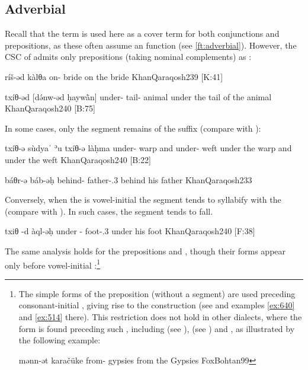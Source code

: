 \subsection{Adverbial \prims}

Recall that the term  is used here as a cover term for both conjunctions and prepositions, as these often assume an  function (see \vref{ft:adverbial}). However, the CSC of \Qar admits only prepositions (taking nominal complements) as \prims: 


{ríš-əd kàlθa}
{on-\cst{} bride}
{on the bride}
{KhanQaraqosh}{239 {[K:41]}}

{txíθ-əd [də́nw-əd ḥaywā̀n]}
{under-\cst{} tail-\cst{} animal}
{under the tail of the animal}
{KhanQaraqosh}{240 {[B:75]}}

In some cases, only the  segment remains of the \cst* suffix (compare with ):

{txíθ-ə sùdyaˈ ʾu\cb{} txíθ-ə làḥma}
	{under-\cst{} warp and\cb{} under-\cst{} weft}
{under the warp and under the weft}
{KhanQaraqosh}{240 {[B:22]}}

{báθr-ə báb-əḥ}
{behind-\cst{} father-\poss.3\masc}
{behind his father}
{KhanQaraqosh}{233}

Conversely, when the \secn is vowel-initial the  segment tends to syllabify with the \secn (compare with ). In such cases, the  segment tends to fall.

{txiθ -d\cb{} àql-əḥ}
{under -\cst\cb{} foot-\poss.3\masc}
{under his foot}
{KhanQaraqosh}{240 {[F:38]}}

\newpage 
The same analysis holds for the prepositions  and , though their \cst* forms appear only before vowel-initial \secns:\footnote{The simple forms of the preposition (without a  segment) are used preceding consonant-initial \secns, giving rise to the  construction (see  and examples \ref{ex:640} and \ref{ex:514} there). This restriction does not hold in other dialects, where the \cst* form  is found preceding such \secns, including \Nrt (see ), \JUrm (see ) and \Boh, as illustrated by the following example:

{mənn-ət karačüke}
{from-\cst{} gypsies}
{from the Gypsies}
{FoxBohtan}{99}

} 

